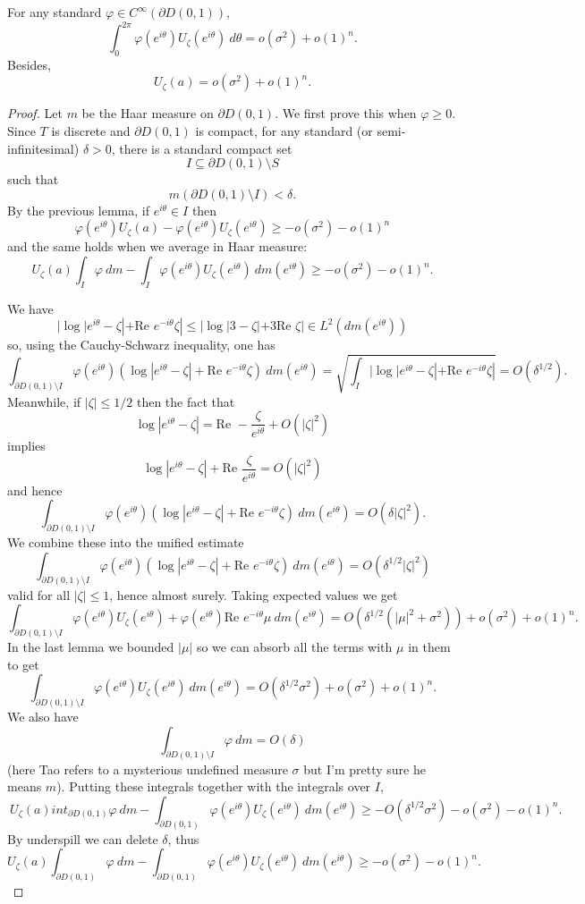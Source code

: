 \documentclass[12pt]{article}
\begin{document}
\begin{lemma}
For any standard $\varphi \in C^\infty(\partial D(0, 1))$,
$$\int_0^{2\pi} \varphi(e^{i\theta}) U_\zeta(e^{i\theta}) ~d\theta = o(\sigma^2) + o(1)^n.$$
Besides,
$$U_\zeta(a) = o(\sigma^2) + o(1)^n.$$
\end{lemma}
\begin{proof}
Let $m$ be the Haar measure on $\partial D(0, 1)$.
We first prove this when $\varphi \geq 0$.
Since $T$ is discrete and $\partial D(0, 1)$ is compact, for any standard (or semi-infinitesimal) $\delta > 0$, there is a standard compact set
$$I \subseteq \partial D(0, 1) \setminus S$$
such that
$$m(\partial D(0, 1) \setminus I) < \delta.$$
By the previous lemma, if $e^{i\theta} \in I$ then
$$\varphi(e^{i\theta}) U_\zeta(a) - \varphi(e^{i\theta}) U_\zeta(e^{i\theta}) \geq -o(\sigma^2) - o(1)^n$$
and the same holds when we average in Haar measure:
$$ U_\zeta(a)\int_I \varphi~dm - \int_I \varphi(e^{i\theta}) U_\zeta(e^{i\theta})~dm(e^{i\theta}) \geq -o(\sigma^2) - o(1)^n.$$

We have
$$|\log |e^{i\theta} - \zeta| + \text{Re } e^{-i\theta}\zeta| \leq |\log|3 - \zeta| + 3\text{Re } \zeta| \in L^2(dm(e^{i\theta}))$$
so, using the Cauchy-Schwarz inequality, one has
$$\int_{\partial D(0, 1) \setminus I} \varphi(e^{i\theta}) (\log |e^{i\theta} - \zeta| + \text{Re } e^{-i\theta}\zeta) ~dm(e^{i\theta}) = \sqrt{\int_I |\log |e^{i\theta} - \zeta| + \text{Re } e^{-i\theta}\zeta|} = O(\delta^{1/2}).$$
Meanwhile, if $|\zeta| \leq 1/2$ then the fact that
$$\log |e^{i\theta} - \zeta| = \text{Re }-\frac{\zeta}{e^{i\theta}} + O(|\zeta|^2)$$
implies
$$\log |e^{i\theta} - \zeta| + \text{Re } \frac{\zeta}{e^{i\theta}} = O(|\zeta|^2)$$
and hence
$$\int_{\partial D(0, 1) \setminus I} \varphi(e^{i\theta}) (\log |e^{i\theta} - \zeta| + \text{Re } e^{-i\theta}\zeta) ~dm(e^{i\theta}) = O(\delta|\zeta|^2).$$
We combine these into the unified estimate
$$\int_{\partial D(0, 1) \setminus I} \varphi(e^{i\theta}) (\log |e^{i\theta} - \zeta| + \text{Re } e^{-i\theta}\zeta) ~dm(e^{i\theta}) = O(\delta^{1/2}|\zeta|^2)$$
valid for all $|\zeta| \leq 1$, hence almost surely.
Taking expected values we get
$$\int_{\partial D(0, 1) \setminus I} \varphi(e^{i\theta})U_\zeta(e^{i\theta}) + \varphi(e^{i\theta}) \text{Re }e^{-i\theta}\mu ~dm(e^{i\theta}) = O(\delta^{1/2}(|\mu|^2 + \sigma^2)) + o(\sigma^2) + o(1)^n.$$
In the last lemma we bounded $|\mu|$ so we can absorb all the terms with $\mu$ in them to get
$$\int_{\partial D(0, 1) \setminus I} \varphi(e^{i\theta})U_\zeta(e^{i\theta}) ~dm(e^{i\theta}) = O(\delta^{1/2}\sigma^2) + o(\sigma^2) + o(1)^n.$$
We also have
$$\int_{\partial D(0, 1) \setminus I} \varphi ~dm = O(\delta)$$
(here Tao refers to a mysterious undefined measure $\sigma$ but I'm pretty sure he means $m$).
Putting these integrals together with the integrals over $I$,
$$\ U_\zeta(a)int_{\partial D(0, 1)} \varphi ~dm - \int_{\partial D(0, 1)} \varphi(e^{i\theta}) U_\zeta(e^{i\theta}) ~dm(e^{i\theta}) \geq -O(\delta^{1/2}\sigma^2) - o(\sigma^2) - o(1)^n.$$
By underspill we can delete $\delta$, thus
$$ U_\zeta(a)\int_{\partial D(0, 1)} \varphi ~dm - \int_{\partial D(0, 1)} \varphi(e^{i\theta}) U_\zeta(e^{i\theta}) ~dm(e^{i\theta}) \geq - o(\sigma^2) - o(1)^n.$$


\end{proof}
\end{document}
